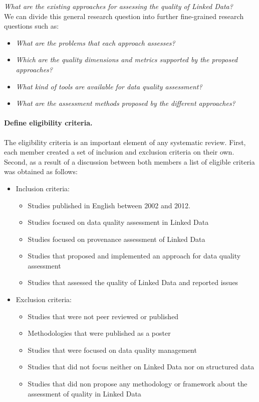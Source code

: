 \emph{What are the existing approaches for assessing the quality of Linked Data?}\\

We can divide this general research question into further fine-grained research questions such as: 
\begin{itemize}
\item		\textit{What are the problems that each approach assesses?}
\item		\textit{Which are the quality dimensions and metrics supported by the proposed approaches?}
\item		\textit{What kind of tools are available for data quality assessment?}
\item		\textit{What are the assessment methods proposed by the different approaches?}
\end{itemize}

\paragraph{Define eligibility criteria.}
The eligibility criteria is an important element of any systematic review. 
First, each member created a set of inclusion and exclusion criteria on their own. 
Second, as a result of a discussion between both members a list of eligible criteria was obtained as follows:
\begin{itemize}
\item Inclusion criteria:
\begin{itemize}
\item Studies published in English between 2002 and 2012.
\item Studies focused on data quality assessment in Linked Data	
\item Studies focused on provenance assessment of Linked Data
\item Studies that proposed and implemented an approach for data quality assessment
\item Studies that assessed the quality of Linked Data and reported issues 
\end{itemize}
\item Exclusion criteria:
\begin{itemize}
\item Studies that were not peer reviewed or published
\item Methodologies that were published as a poster
\item Studies that were focused on data quality management
\item Studies that did not focus neither on Linked Data nor on structured data
\item Studies that did non propose any methodology or framework about the assessment of quality in Linked Data
\end{itemize}
\end{itemize}

